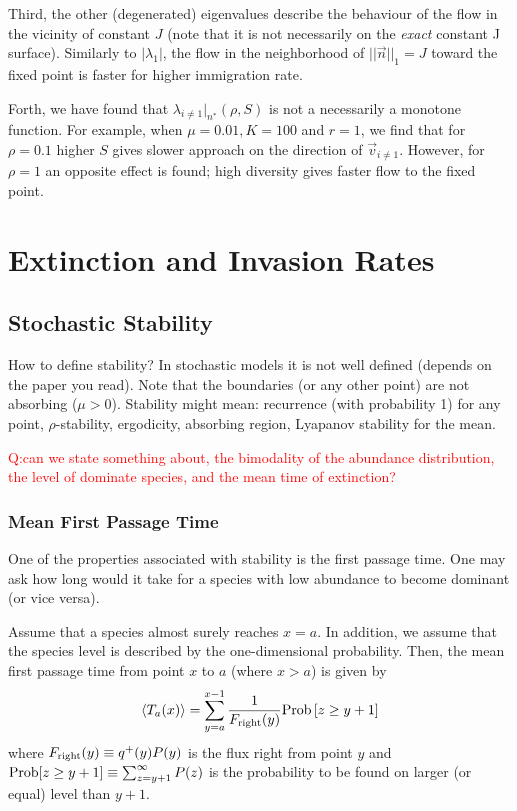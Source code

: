 \documentclass[%
 amsmath,amssymb,
reprint,%
linenumbers]{revtex4-2}
\begin{document}
Third, the other (degenerated) eigenvalues describe the behaviour of the flow in the vicinity of constant $J$ (note that it is not necessarily on the {\em exact} constant J surface). Similarly to $|\lambda_1|$, the flow in the neighborhood of $||\vec{n}||_1=J$ toward the fixed point is faster for higher immigration rate. 

Forth, we have found that $\lambda_{i\neq 1}|_{n^*}(\rho,S)$ is not a necessarily a monotone function. For example, when $\mu=0.01, K=100$ and $r=1$, we find that for $\rho=0.1$ higher $S$ gives slower approach on the direction of $\vec{v}_{i\neq 1}$. However, for $\rho=1$ an opposite effect is found; high diversity gives faster flow to the fixed point.   



\section{Extinction and Invasion Rates}

\subsection{Stochastic Stability}

How to define stability? In stochastic models it is not well defined (depends on the paper you read). Note that the boundaries (or any other point) are not absorbing ($\mu>0$). Stability might mean: recurrence (with probability 1) for any point, $\rho$-stability, ergodicity, absorbing region, Lyapanov stability for the mean.   

\textcolor{red}{Q:can we state something about, the bimodality of the abundance distribution,  the level of dominate species, and the mean time of extinction?  }

\subsubsection{Mean First Passage Time}
One of the properties associated with stability is the first passage time. One may ask how long would it take for a species with low abundance to become dominant (or vice versa). 

Assume that a species almost surely reaches $x=a$. In addition, we assume that the species level is described by the one-dimensional probability. Then, the mean first passage time from point $x$ to $a$ (where $x>a$) is given by 
\begin{equation}
   \langle T_a(x) \rangle =   \sum_{y=a}^{x-1}\frac{1}{F_{\rm right}(y)}{\rm Prob}\left[z\geq y+1\right] \label{eq:MFPT}
\end{equation}
where $F_{\rm right}(y)\equiv q^+(y)P(y)$ is the flux right from point $y$ and ${\rm Prob}[z\geq y+1]\equiv \sum_{z=y+1}^{\infty}P(z)$ is the probability to be found on larger (or equal) level than $y+1$.
\end{document}
